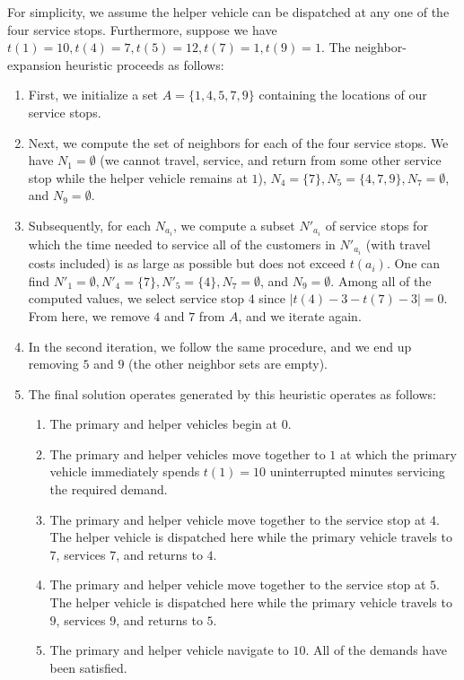 \documentclass[12pt]{scrartcl}
\begin{document}
\noindent For simplicity, we assume the helper vehicle can be dispatched at any one of the four service stops. Furthermore, suppose we have $t(1) = 10, t(4) = 7, t(5) = 12, t(7) = 1, t(9) = 1$.  The neighbor-expansion heuristic proceeds as follows:

\begin{enumerate}
    \item First, we initialize a set $A = \{1, 4, 5, 7, 9\}$ containing the locations of our service stops.
    \item Next, we compute the set of neighbors for each of the four service stops. We have $N_1 = \emptyset$ (we cannot travel, service, and return from some other service stop while the helper vehicle remains at $1$), $N_4 = \{7\}, N_5 = \{4, 7, 9\}, N_7 = \emptyset$, and $N_9 = \emptyset$. 
    \item Subsequently, for each $N_{a_i}$, we compute a subset $N'_{a_i}$ of service stops for which the time needed to service all of the customers in $N'_{a_i}$ (with travel costs included) is as large as possible but does not exceed $t(a_i)$. One can find $N'_{1} = \emptyset, N'_{4} = \{7\}, N'_{5} = \{4\}, N_{7} = \emptyset$, and $N_{9} = \emptyset$. Among all of the computed values, we select service stop $4$ since $|t(4) - 3 - t(7) - 3| = 0$. From here, we remove $4$ and $7$ from $A$, and we iterate again. 
    \item In the second iteration, we follow the same procedure, and we end up removing $5$ and $9$ (the other neighbor sets are empty). 
    \item The final solution operates generated by this heuristic operates as follows:
    \begin{enumerate}
        \item The primary and helper vehicles begin at $0$. 
        \item The primary and helper vehicles move together to $1$ at which the primary vehicle immediately spends $t(1) = 10$ uninterrupted minutes servicing the required demand.
        \item The primary and helper vehicle move together to the service stop at $4$. The helper vehicle is dispatched here while the primary vehicle travels to $7$, services $7$, and returns to $4$.
        \item The primary and helper vehicle move together to the service stop at $5$. The helper vehicle is dispatched here while the primary vehicle travels to $9$, services $9$, and returns to $5$.
        \item The primary and helper vehicle navigate to $10$. All of the demands have been satisfied. 
    \end{enumerate}
\end{enumerate}
\end{document}
